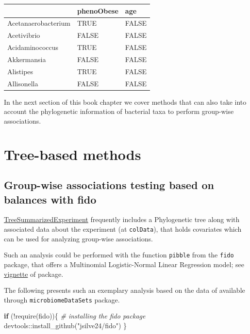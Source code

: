 \documentclass[
]{book}
\newenvironment{Shaded}{\begin{snugshade}}{\end{snugshade}}
\newcommand{\CommentTok}[1]{\textcolor[rgb]{0.56,0.35,0.01}{\textit{#1}}}
\newcommand{\ControlFlowTok}[1]{\textcolor[rgb]{0.13,0.29,0.53}{\textbf{#1}}}
\newcommand{\FunctionTok}[1]{\textcolor[rgb]{0.00,0.00,0.00}{#1}}
\newcommand{\NormalTok}[1]{#1}
\newcommand{\SpecialCharTok}[1]{\textcolor[rgb]{0.00,0.00,0.00}{#1}}
\newcommand{\StringTok}[1]{\textcolor[rgb]{0.31,0.60,0.02}{#1}}
\begin{document}
\begin{tabular}{l|l|l}
\hline
  & phenoObese & age\\
\hline
Acetanaerobacterium & TRUE & FALSE\\
\hline
Acetivibrio & FALSE & FALSE\\
\hline
Acidaminococcus & TRUE & FALSE\\
\hline
Akkermansia & FALSE & FALSE\\
\hline
Alistipes & TRUE & FALSE\\
\hline
Allisonella & FALSE & FALSE\\
\hline
\end{tabular}

In the next section of this book chapter we cover methods that can also take
into account the phylogenetic information of bacterial taxa to perform
group-wise associations.

\hypertarget{tree-based-methods}{%
\section{Tree-based methods}\label{tree-based-methods}}

\hypertarget{group-wise-associations-testing-based-on-balances-with-fido}{%
\subsection{Group-wise associations testing based on balances with fido}\label{group-wise-associations-testing-based-on-balances-with-fido}}

\href{https://bioconductor.org/packages/release/bioc/html/TreeSummarizedExperiment.html}{TreeSummarizedExperiment}
frequently includes a Phylogenetic tree along with associated data about the
experiment (at \texttt{colData}), that holds covariates which can be used for
analyzing group-wise associations.

Such an analysis could be performed with the function \texttt{pibble} from the \texttt{fido}
package, that offers a Multinomial Logistic-Normal Linear Regression model; see
\href{https://jsilve24.github.io/fido/articles/introduction-to-fido.html}{vignette} of package.

The following presents such an exemplary analysis based on the
data of \citet{sprockettMicrobiotaAssemblyStructure2020} available
through \texttt{microbiomeDataSets} package.

\begin{Shaded}
\begin{Highlighting}[]
\ControlFlowTok{if}\NormalTok{ (}\SpecialCharTok{!}\FunctionTok{require}\NormalTok{(fido))\{}
  \CommentTok{\# installing the fido package}
\NormalTok{  devtools}\SpecialCharTok{::}\FunctionTok{install\_github}\NormalTok{(}\StringTok{"jsilve24/fido"}\NormalTok{)}
\NormalTok{\}}
\end{Highlighting}
\end{Shaded}
\end{document}

